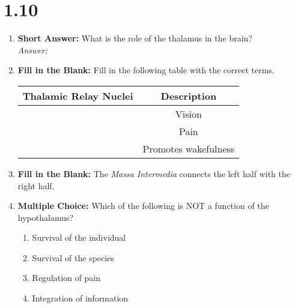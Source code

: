 \section*{1.10 \squigglyline}
\begin{enumerate}[label=\textbf{Q1.10.\arabic*}]
      \item \textbf{Short Answer:} What is the role of the thalamus in the brain? \\
            \textit{Answer:} %

      \item \textbf{Fill in the Blank:} Fill in the following table with the correct terms.
            \begin{table}[htbp]
                  \centering
                  \begin{tabular}{cc}
                        \toprule
                        \textbf{Thalamic Relay Nuclei} & \textbf{Description} \\ \midrule
                        \underline{\hspace{3cm}}       & Vision               \\
                        \underline{\hspace{3cm}}       & Pain                 \\
                        \underline{\hspace{3cm}}       & Promotes wakefulness \\
                        \bottomrule
                  \end{tabular}
            \end{table}

      \item \textbf{Fill in the Blank:} The \textit{Massa Intermedia} connects the left \underline{\hspace{3cm}} half with the right half. \\

      \item \textbf{Multiple Choice:} Which of the following is NOT a function of the hypothalamus?
            \begin{enumerate}[label=(\Alph*)]
                  \item Survival of the individual
                  \item Survival of the species
                  \item Regulation of pain
                  \item Integration of information
            \end{enumerate}


\end{enumerate}
